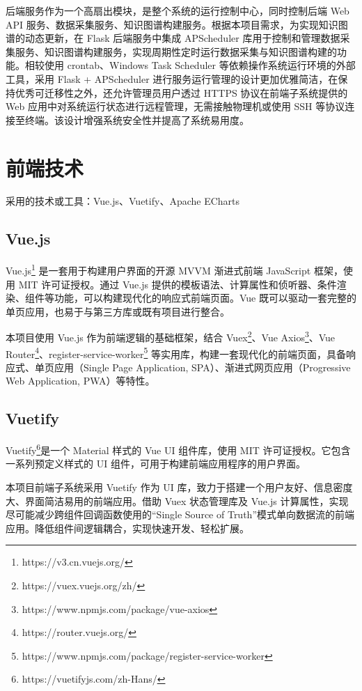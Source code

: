 \documentclass[a4paper,AutoFakeBold,oneside,12pt]{book}
\begin{document}
后端服务作为一个高扇出模块，是整个系统的运行控制中心，同时控制后端 Web API 服务、数据采集服务、知识图谱构建服务。根据本项目需求，为实现知识图谱的动态更新，在 Flask 后端服务中集成 APScheduler 库用于控制和管理数据采集服务、知识图谱构建服务，实现周期性定时运行数据采集与知识图谱构建的功能。相较使用 crontab、Windows Task Scheduler 等依赖操作系统运行环境的外部工具，采用 Flask + APScheduler 进行服务运行管理的设计更加优雅简洁，在保持优秀可迁移性之外，还允许管理员用户透过 HTTPS 协议在前端子系统提供的 Web 应用中对系统运行状态进行远程管理，无需接触物理机或使用 SSH 等协议连接至终端。该设计增强系统安全性并提高了系统易用度。

\section{前端技术}

采用的技术或工具：Vue.js、Vuetify、Apache ECharts

\subsection{Vue.js}

Vue.js\footnote{https://v3.cn.vuejs.org/} 是一套用于构建用户界面的开源 MVVM 渐进式前端 JavaScript 框架，使用 MIT 许可证授权。通过 Vue.js 提供的模板语法、计算属性和侦听器、条件渲染、组件等功能，可以构建现代化的响应式前端页面。Vue 既可以驱动一套完整的单页应用，也易于与第三方库或既有项目进行整合。

本项目使用 Vue.js 作为前端逻辑的基础框架，结合 Vuex\footnote{https://vuex.vuejs.org/zh/}、Vue Axios\footnote{https://www.npmjs.com/package/vue-axios}、Vue Router\footnote{https://router.vuejs.org/}、register-service-worker\footnote{https://www.npmjs.com/package/register-service-worker} 等实用库，构建一套现代化的前端页面，具备响应式、单页应用（Single Page Application, SPA）、渐进式网页应用（Progressive Web Application, PWA）等特性。

\subsection{Vuetify}

Vuetify\footnote{https://vuetifyjs.com/zh-Hans/}是一个 Material 样式的 Vue UI 组件库，使用 MIT 许可证授权。它包含一系列预定义样式的 UI 组件，可用于构建前端应用程序的用户界面。

本项目前端子系统采用 Vuetify 作为 UI 库，致力于搭建一个用户友好、信息密度大、界面简洁易用的前端应用。借助 Vuex 状态管理库及 Vue.js 计算属性，实现尽可能减少跨组件回调函数使用的``Single Source of Truth''模式单向数据流的前端应用。降低组件间逻辑耦合，实现快速开发、轻松扩展。
\end{document}
